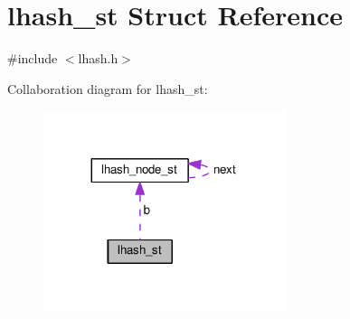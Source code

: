 \hypertarget{structlhash__st}{}\section{lhash\+\_\+st Struct Reference}
\label{structlhash__st}


{\ttfamily \#include $<$lhash.\+h$>$}



Collaboration diagram for lhash\+\_\+st\+:
\nopagebreak
\begin{figure}[H]
\begin{center}
\leavevmode
\includegraphics[width=200pt]{structlhash__st__coll__graph}
\end{center}
\end{figure}
